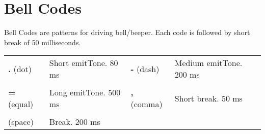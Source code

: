\section{Bell Codes}

Bell Codes are patterns for driving bell/beeper. Each code is followed by short break of 50 milliseconds.

\begin{tabularx}{\textwidth}{l X l X}
	\textbf{.} (dot) & Short emitTone. 80 ms & \textbf{-} (dash) & Medium emitTone. 200 ms
	\\ \\
	\textbf{=} (equal) & Long emitTone. 500 ms & \textbf{,} (comma) & Short break. 50 ms
	\\ \\
	(space) & Break. 200 ms
\end{tabularx}